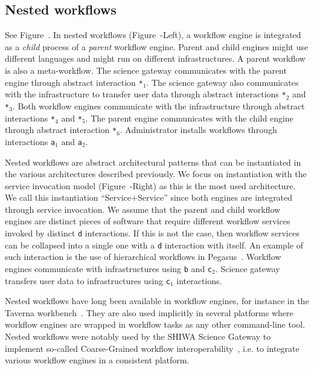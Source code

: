 \documentclass[preprint,3p,twocolumn]{elsarticle}
\newcommand{\correction}[1]{\color{blue}#1\color{black}\xspace}
\begin{document}
\subsection{Nested workflows}

See Figure~. In nested workflows
(Figure~-Left), a workflow engine is integrated
as a \emph{child} process of a \emph{parent} workflow engine. Parent
and child engines might use different languages and might run on
different infrastructures. A parent workflow is also a
meta-workflow. The science gateway communicates with the parent engine
through abstract interaction \texttt{*$_1$}. The science gateway also
communicates with the infrastructure to transfer user data through
abstract interactions \texttt{*$_2$} and \texttt{*$_3$}. Both workflow
engines communicate with the infrastructure through abstract
interactions \texttt{*$_4$} and \texttt{*$_5$}. The parent engine
communicates with the child engine through abstract interaction
\texttt{*$_6$}. Administrator installs workflows through interactions
\texttt{a$_1$} and \texttt{a$_2$}.

Nested workflows are abstract architectural patterns that can be
instantiated in the various architectures described previously. We
focus on instantiation with the service invocation model
(Figure~-Right) as this is the most used
architecture. \correction{We call this instantiation
  ``Service+Service'' since both engines are integrated through
  service invocation.} We assume that the parent
and child workflow engines are distinct pieces of software that
require different workflow services invoked by distinct \texttt{d}
interactions. If this is not the case, then workflow services can be
collapsed into a single one with a \texttt{d} interaction with
itself. An example of such interaction is the use of hierarchical
workflows in Pegasus~\cite{Deelman201517}.  Workflow engines
communicate with infrastructures using \texttt{b} and
\texttt{c$_2$}. Science gateway transfers user data to infrastructures
using \texttt{c$_1$} interactions.


Nested workflows have long been available in workflow engines, for
instance in the Taverna workbench~\cite{oinn2004taverna}. They are
also used implicitly in several platforms where workflow engines are
wrapped in workflow tasks as any other command-line tool. Nested
workflows were notably used by the SHIWA Science Gateway to implement
so-called Coarse-Grained workflow
interoperability~\cite{terstyanszky2014enabling}, i.e. to integrate
various workflow engines in a consistent
platform. 
\end{document}
